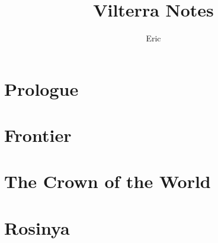 \documentclass[10pt,twoside,twocolumn,openany,nodeprecatedcode]{dndbook}
\title{Vilterra Notes}
\author{Eric}
\begin{document}
\maketitle

\setcounter{chapter}{-1}
\chapter{Prologue}%
\label{cha:Vilterra}


\chapter{Frontier}%
\label{cha:Frontier}



\chapter{The Crown of the World}%
\label{cha:The Crown of the World}



\chapter{Rosinya}%
\label{cha:Rosinya}


\end{document}
